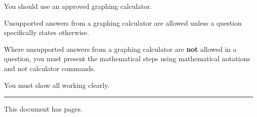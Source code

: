 {{\begin{list}{\textbullet}{\setlength\leftmargin{7mm}\setlength{}\setlength{}\setlength\itemsep{0.6mm}\setlength\topsep{0pt}\setlength\parsep{0pt}}
\item You should use an approved graphing calculator.
\item Unsupported answers from a graphing calculator are allowed unless a question specifically states otherwise.
\item Where unsupported answers from a graphing calculator are \textbf{not} allowed in a question, you must present the mathematical steps using mathematical notations and not calculator commands.
\item You must show all working clearly.
\end{list}
\vspace{6mm}
\par\vspace{0.5mm}
\vfill
\noindent\rule{\linewidth}{0.8pt}\par\vspace{1mm}
\centerline{This document has \textbf{\pageref{LastPage}} pages.}\par\vspace{2mm}
}\clearpage}
\makeatother

\newcommand{\prelimsolhead}[1]{%
{\coverfont\fontsize{10}{12}\selectfont\linespread{1}\selectfont
\noindent{\bfseries \prelimtitle}\\[0.2ex]{\bfseries Compiled by Maximus Pung Jun}\\[1.6ex]Higher 2\par\vspace{2ex}
\noindent\rule{\linewidth}{1.2pt}\par\vspace{0.4ex}
\noindent{\Large\bfseries MATHEMATICS}\hfill{\Large\bfseries 9758}\par\vspace{1.2ex}
\noindent \prelimsubject\hfill\textbf{2026}\\
WORKED SOLUTIONS\hfill\textbf{Total marks: #1}\par\vspace{1ex}
\noindent\rule{\linewidth}{0.6pt}\par}\vspace{4ex}}

